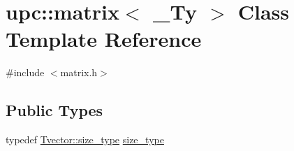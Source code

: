 \hypertarget{classupc_1_1matrix}{}\section{upc\+:\+:matrix$<$ \+\_\+\+Ty $>$ Class Template Reference}
\label{classupc_1_1matrix}


{\ttfamily \#include $<$matrix.\+h$>$}

\subsection*{Public Types}
\begin{DoxyCompactItemize}
\item 
typedef \hyperlink{classupc_1_1array_a85501f086a20ed6686ef78a242b2f302}{Tvector\+::size\+\_\+type} \hyperlink{classupc_1_1matrix_a0f2b47f0fc08216f8e0ef1cc1c022663}{size\+\_\+type}
\end{DoxyCompactItemize}
